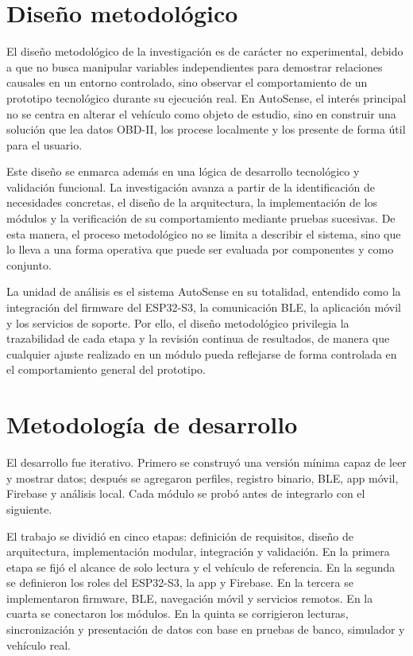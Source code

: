 \documentclass[12pt,letterpaper]{report}
\begin{document}
\section{Diseño metodológico}

\label{sec:diseno-metodologico}

El diseño metodológico de la investigación es de carácter no experimental, debido a que no busca manipular variables independientes para demostrar relaciones causales en un entorno controlado, sino observar el comportamiento de un prototipo tecnológico durante su ejecución real. En AutoSense, el interés principal no se centra en alterar el vehículo como objeto de estudio, sino en construir una solución que lea datos OBD-II, los procese localmente y los presente de forma útil para el usuario.

Este diseño se enmarca además en una lógica de desarrollo tecnológico y validación funcional. La investigación avanza a partir de la identificación de necesidades concretas, el diseño de la arquitectura, la implementación de los módulos y la verificación de su comportamiento mediante pruebas sucesivas. De esta manera, el proceso metodológico no se limita a describir el sistema, sino que lo lleva a una forma operativa que puede ser evaluada por componentes y como conjunto.

La unidad de análisis es el sistema AutoSense en su totalidad, entendido como la integración del firmware del ESP32-S3, la comunicación BLE, la aplicación móvil y los servicios de soporte. Por ello, el diseño metodológico privilegia la trazabilidad de cada etapa y la revisión continua de resultados, de manera que cualquier ajuste realizado en un módulo pueda reflejarse de forma controlada en el comportamiento general del prototipo.

\section{Metodología de desarrollo}

\label{sec:metodologia-desarrollo}

El desarrollo fue iterativo. Primero se construyó una versión mínima capaz de leer y mostrar datos; después se agregaron perfiles, registro binario, BLE, app móvil, Firebase y análisis local. Cada módulo se probó antes de integrarlo con el siguiente.

El trabajo se dividió en cinco etapas: definición de requisitos, diseño de arquitectura, implementación modular, integración y validación. En la primera etapa se fijó el alcance de solo lectura y el vehículo de referencia. En la segunda se definieron los roles del ESP32-S3, la app y Firebase. En la tercera se implementaron firmware, BLE, navegación móvil y servicios remotos. En la cuarta se conectaron los módulos. En la quinta se corrigieron lecturas, sincronización y presentación de datos con base en pruebas de banco, simulador y vehículo real.
\end{document}
